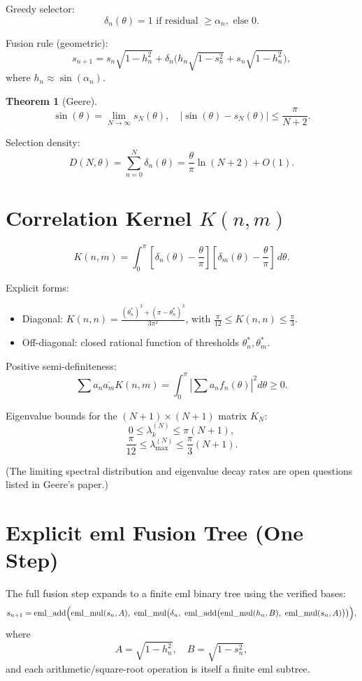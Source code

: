\documentclass[11pt,a4paper]{article}
\newtheorem{theorem}{Theorem}
\begin{document}
Greedy selector:
\[
\delta_n(\theta) = 1 \text{ if residual } \geq \alpha_n, \text{ else } 0.
\]

Fusion rule (geometric):
\[
s_{n+1} = s_n \sqrt{1 - h_n^2} + \delta_n \bigl( h_n \sqrt{1 - s_n^2} + s_n \sqrt{1 - h_n^2} \bigr),
\]
where \(h_n \approx \sin(\alpha_n)\).

\begin{theorem}[Geere]
\[
\sin(\theta) = \lim_{N\to\infty} s_N(\theta), \quad |\sin(\theta) - s_N(\theta)| \leq \frac{\pi}{N+2}.
\]
\end{theorem}

Selection density:
\[
D(N,\theta) = \sum_{n=0}^N \delta_n(\theta) = \frac{\theta}{\pi} \ln(N+2) + O(1).
\]

\section{Correlation Kernel \(K(n,m)\)}
\[
K(n,m) = \int_0^\pi \left[ \delta_n(\theta) - \frac{\theta}{\pi} \right] \left[ \delta_m(\theta) - \frac{\theta}{\pi} \right] \, d\theta.
\]

Explicit forms:
\begin{itemize}
\item Diagonal: \(K(n,n) = \frac{(\theta_n^*)^3 + (\pi - \theta_n^*)^3}{3\pi^2}\), with \(\frac{\pi}{12} \leq K(n,n) \leq \frac{\pi}{3}\).
\item Off-diagonal: closed rational function of thresholds \(\theta_n^*,\theta_m^*\).
\end{itemize}

Positive semi-definiteness:
\[
\sum a_n \overline{a_m} K(n,m) = \int_0^\pi \left| \sum a_n f_n(\theta) \right|^2 d\theta \geq 0.
\]

Eigenvalue bounds for the \((N+1)\times(N+1)\) matrix \(K_N\):
\[
0 \leq \lambda_k^{(N)} \leq \pi(N+1),
\]
\[
\frac{\pi}{12} \leq \lambda_{\max}^{(N)} \leq \frac{\pi}{3}(N+1).
\]

(The limiting spectral distribution and eigenvalue decay rates are open questions listed in Geere’s paper.)

\section{Explicit eml Fusion Tree (One Step)}
The full fusion step expands to a finite eml binary tree using the verified bases:
\[
s_{n+1} = \mathrm{eml\_add}\Bigl(
  \mathrm{eml\_mul}(s_n, A),\ 
  \mathrm{eml\_mul}\bigl(\delta_n,\ 
  \mathrm{eml\_add}\bigl(
    \mathrm{eml\_mul}(h_n, B),\ 
    \mathrm{eml\_mul}(s_n, A)
  \bigr)
  \bigr)
\Bigr),
\]
where
\[
A = \sqrt{1-h_n^2}, \quad B = \sqrt{1-s_n^2},
\]
and each arithmetic/square-root operation is itself a finite eml subtree.
\end{document}
